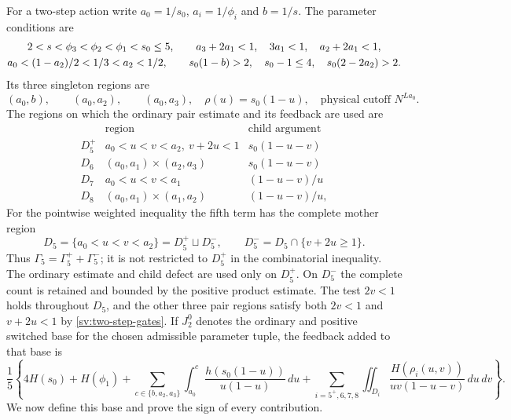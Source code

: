 For a two-step action write $a_0=1/s_0$, $a_i=1/\phi_i$ and $b=1/s$.
The parameter conditions are
\begin{gather}\label{sv:two-step-gates}
 2<s<\phi_3<\phi_2<\phi_1<s_0\le5,\qquad
 a_3+2a_1<1,\quad3a_1<1,\quad a_2+2a_1<1,\notag\\
 a_0<(1-a_2)/2<1/3<a_2<1/2,\qquad
 s_0(1-b)>2,\quad s_0-1\le4,\quad s_0(2-2a_2)>2.
\end{gather}
Its three singleton regions are
\begin{equation}\label{sv:singleton-domains}
 (a_0,b),\qquad(a_0,a_2),\qquad(a_0,a_3),
 \quad \rho(u)=s_0(1-u),
 \quad\text{physical cutoff }N^{La_0}.
\end{equation}
The regions on which the ordinary pair estimate and its feedback are used are
\[
\begin{array}{c|c|c}
 &\text{region}&\text{child argument}\\ \hline
 D_5^+&a_0<u<v<a_2,\ v+2u<1&s_0(1-u-v)\\
 D_6&(a_0,a_1)\times(a_2,a_3)&s_0(1-u-v)\\
 D_7&a_0<u<v<a_1&(1-u-v)/u\\
 D_8&(a_0,a_1)\times(a_1,a_2)&(1-u-v)/u,
\end{array}
\]
For the pointwise weighted inequality the fifth term has the complete
mother region
\begin{equation}\label{sv:complete-fifth-region}
 D_5=\{a_0<u<v<a_2\}
     =D_5^+\sqcup D_5^-,\qquad
 D_5^-=D_5\cap\{v+2u\ge1\}.
\end{equation}
Thus $\Gamma_5=\Gamma_5^++\Gamma_5^-$; it is not restricted to
$D_5^+$ in the combinatorial inequality. The ordinary estimate and
child defect are used only on $D_5^+$. On $D_5^-$ the complete count
is retained and bounded by the positive product estimate.
The test $2v<1$ holds throughout $D_5$, and the other three pair
regions satisfy both $2v<1$ and $v+2u<1$ by
\eqref{sv:two-step-gates}.
If $J_2^0$ denotes the ordinary and positive switched base for the
chosen admissible parameter tuple, the feedback added to that base is
\begin{equation}\label{sv:two-step-feedback}
 \frac15\left\{4H(s_0)+H(\phi_1)
 +\sum_{c\in\{b,a_2,a_3\}}\int_{a_0}^{c}
       \frac{h(s_0(1-u))}{u(1-u)}\,du
 +\sum_{i=5^+,6,7,8}\iint_{D_i}
       \frac{H(\rho_i(u,v))}{uv(1-u-v)}\,du\,dv\right\}.
\end{equation}
We now define this base and prove the sign of every contribution.

